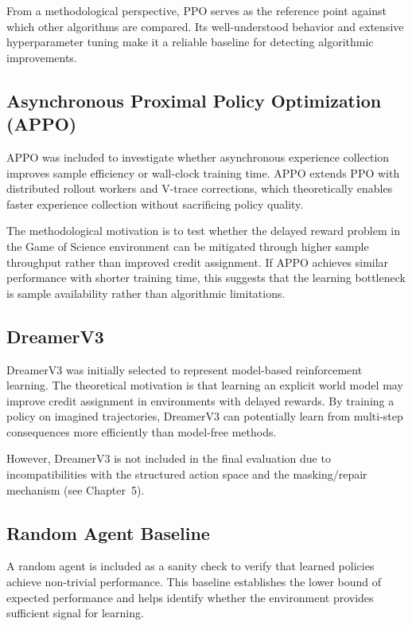 \documentclass[english,bachelor]{hsluthesis}
\begin{document}
From a methodological perspective, PPO serves as the reference point against which other algorithms are compared. Its well-understood behavior and extensive hyperparameter tuning make it a reliable baseline for detecting algorithmic improvements.

\subsection{Asynchronous Proximal Policy Optimization (APPO)}

APPO was included to investigate whether asynchronous experience collection improves sample efficiency or wall-clock training time. APPO extends PPO with distributed rollout workers and V-trace corrections, which theoretically enables faster experience collection without sacrificing policy quality.

The methodological motivation is to test whether the delayed reward problem in the Game of Science environment can be mitigated through higher sample throughput rather than improved credit assignment. If APPO achieves similar performance with shorter training time, this suggests that the learning bottleneck is sample availability rather than algorithmic limitations.

\subsection{DreamerV3}

DreamerV3 was initially selected to represent model-based reinforcement learning. The theoretical motivation is that learning an explicit world model may improve credit assignment in environments with delayed rewards. By training a policy on imagined trajectories, DreamerV3 can potentially learn from multi-step consequences more efficiently than model-free methods.

However, DreamerV3 is not included in the final evaluation due to incompatibilities with the structured action space and the masking/repair mechanism (see Chapter~5).

\subsection{Random Agent Baseline}

A random agent is included as a sanity check to verify that learned policies achieve non-trivial performance. This baseline establishes the lower bound of expected performance and helps identify whether the environment provides sufficient signal for learning.
\end{document}
